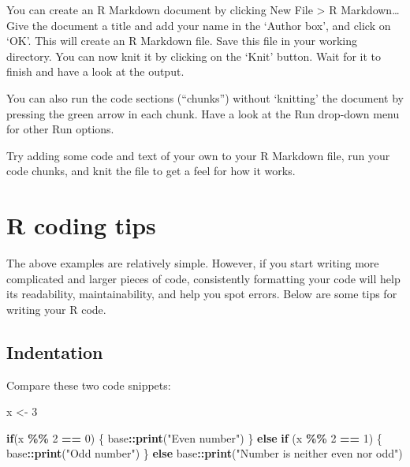 \documentclass[
]{book}
\newenvironment{Shaded}{\begin{snugshade}}{\end{snugshade}}
\newcommand{\ControlFlowTok}[1]{\textcolor[rgb]{0.13,0.29,0.53}{\textbf{#1}}}
\newcommand{\DecValTok}[1]{\textcolor[rgb]{0.00,0.00,0.81}{#1}}
\newcommand{\FunctionTok}[1]{\textcolor[rgb]{0.13,0.29,0.53}{\textbf{#1}}}
\newcommand{\NormalTok}[1]{#1}
\newcommand{\OtherTok}[1]{\textcolor[rgb]{0.56,0.35,0.01}{#1}}
\newcommand{\SpecialCharTok}[1]{\textcolor[rgb]{0.81,0.36,0.00}{\textbf{#1}}}
\newcommand{\StringTok}[1]{\textcolor[rgb]{0.31,0.60,0.02}{#1}}
\begin{document}
You can create an R Markdown document by clicking New File \textgreater{} R Markdown\ldots{} Give the document a title and add your name in the `Author box', and click on `OK'. This will create an R Markdown file. Save this file in your working directory. You can now knit it by clicking on the `Knit' button. Wait for it to finish and have a look at the output.

You can also run the code sections (``chunks'') without `knitting' the document by pressing the green arrow in each chunk. Have a look at the Run drop-down menu for other Run options.

Try adding some code and text of your own to your R Markdown file, run your code chunks, and knit the file to get a feel for how it works.

\section{R coding tips}\label{sec:CodingTips}

The above examples are relatively simple. However, if you start writing more complicated and larger pieces of code, consistently formatting your code will help its readability, maintainability, and help you spot errors. Below are some tips for writing your R code.

\subsection{Indentation}\label{indentation}

Compare these two code snippets:

\begin{Shaded}
\begin{Highlighting}[]
\NormalTok{x }\OtherTok{\textless{}{-}} \DecValTok{3}

\ControlFlowTok{if}\NormalTok{(x }\SpecialCharTok{\%\%} \DecValTok{2} \SpecialCharTok{==} \DecValTok{0}\NormalTok{) \{}
\NormalTok{base}\SpecialCharTok{::}\FunctionTok{print}\NormalTok{(}\StringTok{"Even number"}\NormalTok{)}
\NormalTok{\} }\ControlFlowTok{else} \ControlFlowTok{if}\NormalTok{ (x }\SpecialCharTok{\%\%} \DecValTok{2} \SpecialCharTok{==} \DecValTok{1}\NormalTok{) \{}
\NormalTok{base}\SpecialCharTok{::}\FunctionTok{print}\NormalTok{(}\StringTok{"Odd number"}\NormalTok{)}
\NormalTok{\} }\ControlFlowTok{else}
\NormalTok{base}\SpecialCharTok{::}\FunctionTok{print}\NormalTok{(}\StringTok{"Number is neither even nor odd"}\NormalTok{)}
\end{Highlighting}
\end{Shaded}
\end{document}
